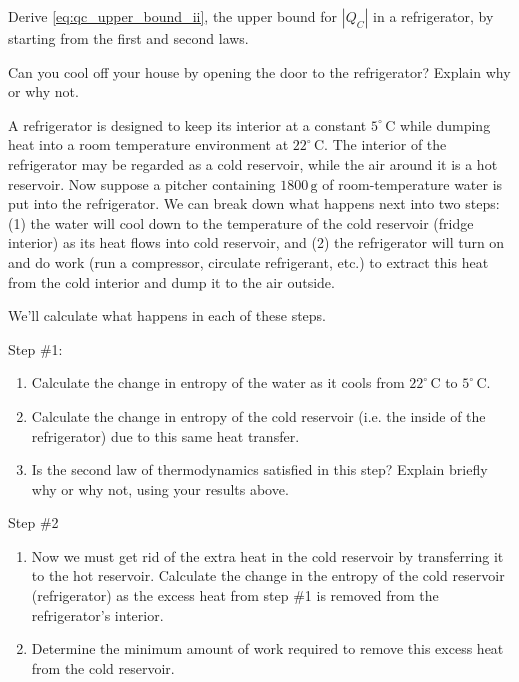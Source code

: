 \begin{exercise} 
  Derive \eqref{eq:qc_upper_bound_ii}, the upper bound for $|Q_C|$
  in a refrigerator, by starting from the first and second laws.
\end{exercise}

\begin{exercise}
  Can you cool off your house by opening the door to the refrigerator?
  Explain why or why not.
\end{exercise}



\begin{exercise} 
 A  refrigerator is designed to  keep its interior  at a constant
  $5^\circ\,\text{C}$  while  dumping  heat  into  a  room  temperature
  environment at $22^\circ\,\text{C}$.  The interior of
  the refrigerator may be regarded as a cold reservoir, 
  while the air  around it is a
  hot reservoir.  Now suppose  a pitcher containing $1800\,\text{g}$ of
  room-temperature water  is put into  the refrigerator. We  can break
  down what happens next into two  steps: (1) the water will cool down
  to the  temperature of the  cold reservoir (fridge interior)  as its
  heat flows into  cold reservoir, and (2) the  refrigerator will turn
  on and do  work (run a compressor, circulate  refrigerant, etc.)  to
  extract this  heat from  the cold  interior and dump  it to  the air
  outside.

  We'll calculate what happens in each of these steps.

Step \#1:
\begin{enumerate}
\item  Calculate the change in entropy of the water as it cools from 
$22^\circ\,\text{C}$ to $5^\circ\,\text{C}$.
\item Calculate the change in entropy of the cold reservoir (i.e. the
inside of the refrigerator) due to this same heat transfer.

\item Is the second law of thermodynamics satisfied in this step?
Explain briefly why or why not, using your results above.
\end{enumerate}

Step \#2
\begin{enumerate}

\item Now we must get rid of the extra heat in the cold reservoir 
  by   transferring  it  to  the  hot  reservoir.
  Calculate the change in the entropy of the cold reservoir
(refrigerator) as the excess heat
  from step \#1 is removed from the refrigerator's interior.

\item  Determine the minimum amount  of work required to remove this 
excess heat
from the cold reservoir. 


\end{enumerate}
\end{exercise}






